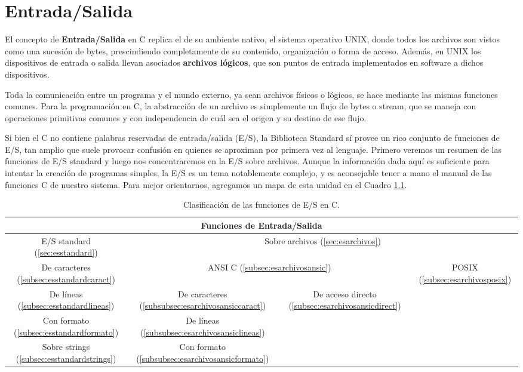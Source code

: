 


\chapter{Entrada/Salida}

El concepto de \textbf{Entrada/Salida} en C replica el de su ambiente nativo, el sistema
operativo UNIX, donde todos los archivos son vistos como una sucesión de bytes,
prescindiendo completamente de su contenido, organización o forma de acceso.
Además, en UNIX los dispositivos de entrada o salida llevan asociados \textbf{archivos
lógicos}, que son puntos de entrada implementados en software a dichos
dispositivos. 

Toda la comunicación entre un programa y el mundo externo, ya
sean archivos físicos o lógicos, se hace mediante las mismas funciones comunes.
Para la programación en C, la abstracción de un
archivo es simplemente un flujo de bytes o stream, que se maneja con
operaciones primitivas comunes y con independencia de cuál sea el origen y su destino de ese flujo.

Si bien el C no contiene palabras reservadas de entrada/salida (E/S), la
Biblioteca Standard sí provee un rico conjunto de funciones de E/S, tan amplio
que suele provocar confusión en quienes se aproximan por primera vez al
lenguaje. Primero veremos un resumen de las funciones de E/S standard
y luego nos concentraremos en la E/S sobre archivos. Aunque la información dada
aquí es suficiente para intentar la creación de programas simples, la E/S es un
tema notablemente complejo, y es aconsejable tener a mano el manual de las
funciones C de nuestro sistema. Para mejor orientarnos, agregamos un mapa de esta unidad en el Cuadro \ref{tab:mapaes}.


\begin{table}[htbp]
\centering
\begin{tabular}{|c|c|c|c|}
\hline
\multicolumn{4}{|c|}{Funciones de Entrada/Salida}\\
\hline
		E/S standard (\ref{sec:esstandard})& \multicolumn{3}{c|}{Sobre archivos (\ref{sec:esarchivos})}\\
		\hline
		De caracteres (\ref{subsec:esstandardcaract})& \multicolumn{2}{c|}{ANSI C (\ref{subsec:esarchivosansic})}  & POSIX (\ref{subsec:esarchivosposix})\\\cline{2-4}
		De líneas (\ref{subsec:esstandardlineas})& De caracteres (\ref{subsubsec:esarchivosansiccaract})& De acceso directo (\ref{subsec:esarchivosansicdirect})& \\
		Con formato (\ref{subsec:esstandardformato})& De líneas (\ref{subsubsec:esarchivosansiclineas})& & \\
		Sobre strings (\ref{subsec:esstandardstrings})& Con formato (\ref{subsubsec:esarchivosansicformato})& & \\
\hline
\end{tabular}
\caption{Clasificación de las funciones de E/S en C.}
\label{tab:mapaes}
\end{table}



